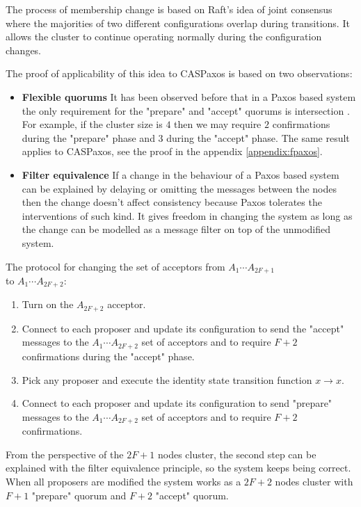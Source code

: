 \documentclass[12pt]{article}
\theoremstyle{definition}
\begin{document}
The process of membership change is based on Raft's idea of joint consensus where the majorities of two different configurations overlap during transitions. It allows the cluster to continue operating normally during the configuration changes.

The proof of applicability of this idea to CASPaxos is based on two observations:

\begin{itemize}
  \item {\bf Flexible quorums} It has been observed before that in a Paxos based system the only requirement for the "prepare" and "accept" quorums is intersection \cite{abcds}\cite{vertical}\cite{fpaxos}. For example, if the cluster size is $4$ then we may require $2$ confirmations during the "prepare" phase and $3$ during the "accept" phase. The same result applies to CASPaxos, see the proof in the appendix \ref{appendix:fpaxos}.
  
  \item {\bf Filter equivalence} If a change in the behaviour of a Paxos based system can be explained by delaying or omitting the messages between the nodes then the change doesn't affect consistency because Paxos tolerates the interventions of such kind. It gives freedom in changing the system as long as the change can be modelled as a message filter on top of the unmodified system.
\end{itemize}

The protocol for changing the set of acceptors from $A_1 \cdots A_{2F+1}$ \\
to $A_1 \cdots A_{2F+2}$:
\begin{enumerate}
  \item Turn on the $A_{2F+2}$ acceptor.
  \item Connect to each proposer and update its configuration to send the "accept" messages to the $A_1 \cdots A_{2F+2}$ set of acceptors and to require $F+2$ confirmations during the "accept" phase.
  \item Pick any proposer and execute the identity state transition function $x \to x$.
  \item Connect to each proposer and update its configuration to send "prepare" messages to the $A_1 \cdots A_{2F+2}$ set of acceptors and to require $F+2$ confirmations.
\end{enumerate}

From the perspective of the $2F+1$ nodes cluster, the second step can be explained with the filter equivalence principle, so the system keeps being correct. When all proposers are modified the system works as a $2F+2$ nodes cluster with $F+1$ "prepare" quorum and $F+2$ "accept" quorum.
\end{document}
